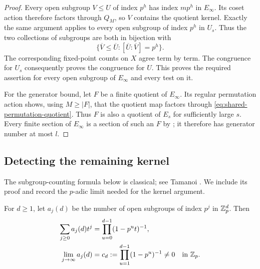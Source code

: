 \begin{proof}
Every open subgroup $V\leq U$ of index $p^h$ has index $mp^h$ in
$E_\infty$.  Its coset action therefore factors through $Q_M$, so $V$
contains the quotient kernel.  Exactly the same argument applies to
every open subgroup of index $p^h$ in $U_s$.  Thus the two collections
of subgroups are both in bijection with
\[
 \{\overline V\leq\overline U:
                 [\overline U:\overline V]=p^h\}.
\]
The corresponding fixed-point counts on $X$ agree term by term.
The congruence for $U_s$ consequently proves the congruence for $U$.
This proves the required assertion for every open subgroup of
$E_\infty$ and every test on it.

For the generator bound, let $F$ be a finite quotient of $E_\infty$.
Its regular permutation action shows, using $M\geq|F|$, that the
quotient map factors through \eqref{eq:shared-permutation-quotient}.
Thus $F$ is also a quotient of $E_s$ for sufficiently large $s$.
Every finite section of $E_\infty$ is a section of such an $F$ by
; it therefore has generator number at
most $l$.
\end{proof}

\subsection{Detecting the remaining kernel}

The subgroup-counting formula below is classical; see
Tamanoi \cite[Lemma~5-5]{Tamanoi2001}. We include its proof and record
the \(p\)-adic limit needed for the kernel argument.

\begin{lemma}\label{lem:lattice-limit}
For $d\geq1$, let $a_j(d)$ be the number of open subgroups of index
$p^j$ in $\mathbb Z_p^d$.  Then
\begin{equation}\label{eq:lattice-generating-function}
 \begin{aligned}
 \sum_{j\geq0}a_j(d)t^j
       &=\prod_{u=0}^{d-1}(1-p^u t)^{-1},\\
 \lim_{j\to\infty}a_j(d)
       &=c_d:=\prod_{u=1}^{d-1}(1-p^u)^{-1}\ne0
 \quad\text{in }\mathbb Z_p.
 \end{aligned}
\end{equation}
\end{lemma}

